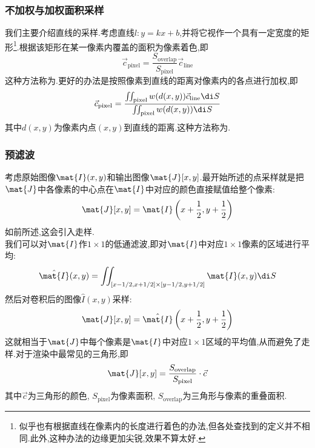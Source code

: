 \documentclass{ctexart}
\begin{document}
\subsubsection{不加权与加权面积采样}
我们主要介绍直线的采样.考虑直线$l:y=kx+b$,并将它视作一个具有一定宽度的矩形\footnote{似乎也有根据直线在像素内的长度进行着色的办法,但各处查找到的定义并不相同.此外,这种办法的边缘更加尖锐,效果不算太好.}.根据该矩形在某一像素内覆盖的面积为像素着色,即
\[\vec{c}_{\text{pixel}}=\dfrac{S_{\text{overlap}}}{S_{\text{pixel}}}\vec{c}_{\text{line}}\]
这种方法称为.更好的办法是按照像素到直线的距离对像素内的各点进行加权,即
\[\vec{c}_{\text{pixel}}=\dfrac{\iint_{\text{pixel}}w(d(x,y))\vec{c}_{\text{line}}\di S}{\iint_{\text{pixel}}w(d(x,y))\di S}\]
其中$d(x,y)$为像素内点$(x,y)$到直线的距离.这种方法称为.
\subsubsection{预滤波}
考虑原始图像$\mat{I}(x,y)$和输出图像$\mat{J}[x,y]$.最开始所述的点采样就是把$\mat{J}$中各像素的中心点在$\mat{I}$中对应的颜色直接赋值给整个像素:
\[\mat{J}[x,y]=\mat{I}\left(x+\dfrac12,y+\dfrac12\right)\]
如前所述,这会引入走样.\\
\indent 我们可以对$\mat{I}$作$1\times1$的低通滤波,即对$\mat{I}$中对应$1\times1$像素的区域进行平均:
\[\hat{\mat{I}}(x,y)=\iint_{[x-1/2,x+1/2]\times[y-1/2,y+1/2]}\mat{I}(x,y)\di S\]
然后对卷积后的图像$\hat{I}(x,y)$采样:
\[\mat{J}[x,y]=\hat{\mat{I}}\left(x+\dfrac12,y+\dfrac12\right)\]
这就相当于$\mat{J}$中每个像素是$\mat{I}$中对应$1\times1$区域的平均值,从而避免了走样.对于渲染中最常见的三角形,即
\[\mat{J}[x,y]=\dfrac{S_{\text{overlap}}}{S_{\text{pixel}}}\cdot\vec{c}\]
其中$\vec{c}$为三角形的颜色, $S_{\text{pixel}}$为像素面积, $S_{\text{overlap}}$为三角形与像素的重叠面积.
\end{document}
